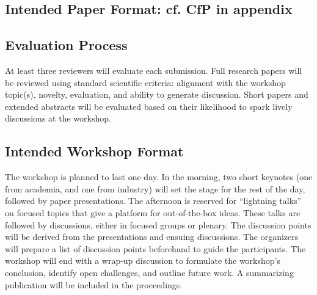 \subsection{Intended Paper Format: cf. CfP in appendix}

\subsection{Evaluation Process}
At least three reviewers will evaluate each submission.
Full research papers will be reviewed using standard scientific criteria: alignment 
with the workshop topic(s), novelty, evaluation, and ability to generate discussion.
Short papers and extended abstracts will be evaluated based on their likelihood 
to spark lively discussions at the workshop.

\subsection{Intended Workshop Format}
The workshop is planned to last one day.
In the morning, two short keynotes (one from academia, and one from industry) 
will set the stage for the rest of the day, followed by paper presentations.
The afternoon is reserved for ``lightning talks'' on focused topics that give a 
platform for out-of-the-box ideas.
These talks are followed by discussions, either in focused groups or plenary.
The discussion points will be derived from the presentations and ensuing discussions.
The organizers will prepare a list of discussion points beforehand to guide the 
participants. %
The workshop will end with a wrap-up discussion to formulate the workshop's 
conclusion, identify open challenges, and outline future work.
A summarizing publication will be included in the proceedings.

